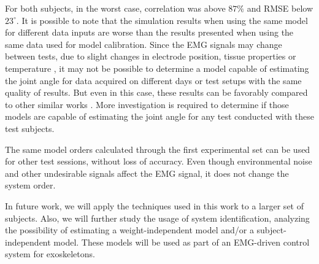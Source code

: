 \documentclass[letterpaper, 10 pt, conference]{ieeeconf}  %
\begin{document}
For both subjects, in the worst case, correlation was above $87\%$ and RMSE below $23^\circ$. It is possible to note that the simulation results when using the same model for different data inputs are worse than the results presented when using the same data used for model calibration. Since the EMG signals may change between tests, due to slight changes in electrode position, tissue properties or temperature \cite{soderberg1975}, it may not be possible to determine a model capable of estimating the joint angle for data acquired on different days or test setups with the same quality of results. But even in this case, these results can be favorably compared to other similar works \cite{Rahmatian2016158,Mamikoglu2016785,Pang2015165,Liu1999391}. More investigation is required to determine if those models are capable of estimating the joint angle for any test conducted with these test subjects.

The same model orders calculated through the first experimental set can be used for other test sessions, without loss of accuracy. Even though environmental noise and other undesirable signals affect the EMG signal, it does not change the system order.

In future work, we will apply the techniques used in this work to a larger set of subjects. Also, we will further study the usage of system identification, analyzing the possibility of estimating a weight-independent model and/or a subject-independent model. These models will be used as part of an EMG-driven control system for exoskeletons.





\end{document}
